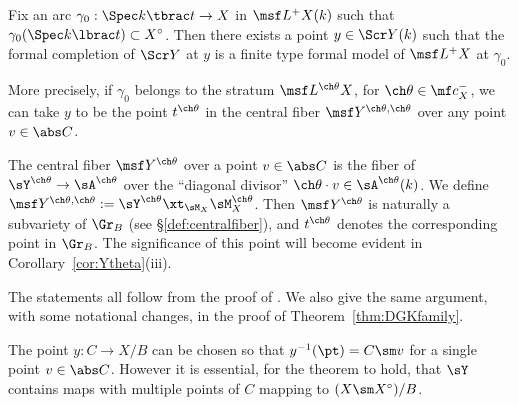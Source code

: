 \begin{thm}
\notready  \label{thm:DGK}
Fix an arc $\gamma_0 : \Spec k\tbrac t \to X$ in $\msf L^+ X(k)$
such that $\gamma_0(\Spec k\lbrac t) \subset X^\circ$.
Then there exists a point $y \in \Scr Y(k)$
such that the formal completion of $\Scr Y$ at $y$ is a finite type formal model of $\msf L^+ X$ at $\gamma_0$.

More precisely, if $\gamma_0$ belongs to the stratum $\msf L^{\ch\theta} X$, for $\ch\theta\in \mf c_X^-$, we can take $y$ to be the point $t^{\ch\theta}$ in the central fiber $\msf Y^{\ch\theta,\ch\theta}$ over any point $v\in \abs C$.
\end{thm}


The central fiber $\msf Y^{\ch\theta}$
over a point $v\in \abs C$ is the fiber of $\sY^{\ch\theta}\to \sA^{\ch\theta}$ over the
``diagonal divisor'' $\ch\theta \cdot v \in \sA^{\ch\theta}(k)$.
We define $\msf Y^{\ch\theta,\ch\theta} := \sY^{\ch\theta} \xt_{\sM_X} \sM_X^{\ch\theta}$.
Then $\msf Y^{\ch\theta}$ is naturally a subvariety of $\Gr_B$ (see \S\ref{def:centralfiber}),
and $t^{\ch\theta}$ denotes the corresponding point in $\Gr_B$. The significance of
this point will become evident in Corollary~\ref{cor:Ytheta}(iii).



The statements all follow from the proof of \cite[\S 4]{Drinfeld}.
We also give the same argument, with some notational changes, in the proof of Theorem~\ref{thm:DGKfamily}.


\begin{rem}
\notready
The point $y : C \to X/B$ can be chosen so that $y^{-1}(\pt) = C\sm v$ for a single
point $v\in \abs C$. However it is essential, for the theorem to hold, that $\sY$ contains
maps with multiple points of $C$ mapping to $(X\sm X^\circ)/B$.
\end{rem}
